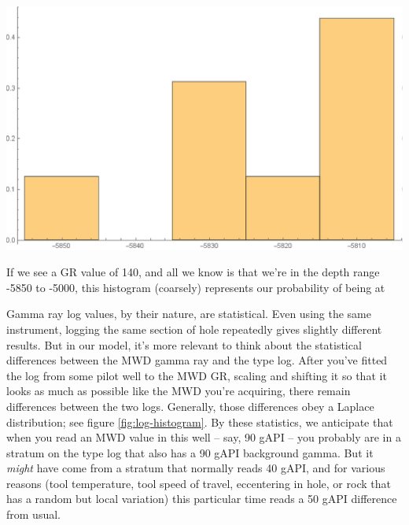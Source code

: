 \documentclass{tufte-handout}
\begin{document}
\begin{marginfigure}
  \includegraphics{gr140-histogram}
  \caption{If we see a GR value of 140, and all we know is that we're in the
  depth range -5850 to -5000, this histogram (coarsely) represents our probability
  of being at }
  \label{fig:gr140-histogram}
\end{marginfigure}

Gamma ray log values, by their nature, are statistical. Even using the same instrument, logging the same section of hole repeatedly gives slightly different results. But in our model, it's more relevant to think about the statistical differences between the MWD gamma ray and the type log. After you've fitted the log from some pilot well to the MWD GR, scaling and shifting it so that it looks as much as possible like the MWD you're acquiring, there remain differences between the two logs. Generally, those differences obey a Laplace distribution; see figure \ref{fig:log-histogram}.
By these statistics, we anticipate that when you read an MWD value in this well -- say, 90 gAPI -- you probably are in a stratum on the type log that also has a 90 gAPI background gamma. But it \emph{might} have come from a stratum that normally reads 40 gAPI, and for various reasons (tool temperature, tool speed of travel, eccentering in hole, or rock that has a random but local variation) this particular time reads a 50 gAPI difference from usual. 
\end{document}
